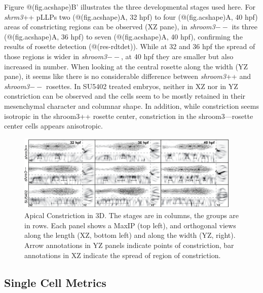 \documentclass[11pt,singlespacinge,twoside]{reedthesis} %
\begin{document}
Figure @(fig.acshape)B' illustrates the three developmental stages used here. For \emph{shrm3}++ pLLPs two (@(fig.acshape)A, 32 hpf) to four (@(fig.acshape)A, 40 hpf) areas of constricting regions can be observed (XZ pane), in \emph{shroom3}\(--\) its three (@(fig.acshape)A, 36 hpf) to seven (@(fig.acshape)A, 40 hpf), confirming the results of rosette detection (@(res-rdtdet)). While at 32 and 36 hpf the spread of those regions is wider in \emph{shroom3}\(--\), at 40 hpf they are smaller but also increased in number. When looking at the central rosette along the width (YZ pane), it seems like there is no considerable difference between \emph{shroom3}++ and \emph{shroom3}\(--\) rosettes. In SU5402 treated embryos, neither in XZ nor in YZ constriction can be observed and the cells seem to be mostly retained in their mesenchymal character and columnar shape. In addition, while constriction seems isotropic in the shroom3++ rosette center, constriction in the shroom3---rosette center cells appears anisotropic.


\begin{figure}

{\centering \includegraphics[width=0.95\textwidth]{figures/results/04_constriction/Figure_5-1} 

}

\caption[Apical Constriction in 3D]{Apical Constriction in 3D. The stages are in columns, the groups are in rows. Each panel shows a MaxIP (top left), and orthogonal views along the length (XZ, bottom left) and along the width (YZ, right). Arrow annotations in YZ panels indicate points of constriction, bar annotations in XZ indicate the spread of region of constriction.}\label{fig:acshape}
\end{figure}
\hypertarget{single-cell-metrics}{%
\subsection{Single Cell Metrics}\label{single-cell-metrics}}
\end{document}
